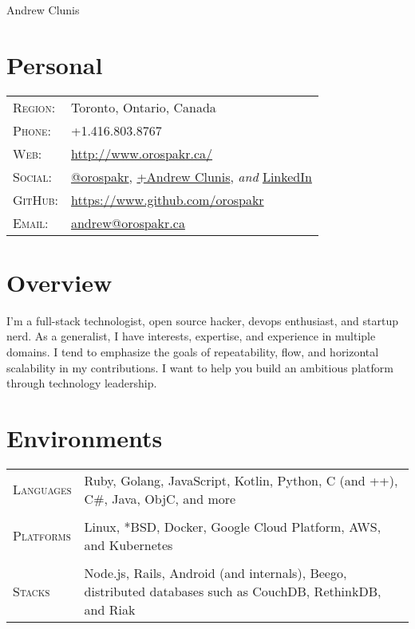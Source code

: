 \documentclass[letterpaper,10pt]{article}
\begin{document}
\pagestyle{empty} %

\par{\centering
{\Huge Andrew \textsc Clunis
}\bigskip\par}

\section{Personal}
\begin{longtable}{p{3cm}|p{12cm}}
  \textsc{Region:} & Toronto, Ontario, Canada \\
  \textsc{Phone:} & +1.416.803.8767 \\
  \textsc{Web:} &  \href{http://www.orospakr.ca/}{http://www.orospakr.ca/} \\
  \textsc{Social:} & \href{http://twitter.com/orospakr}{@orospakr}, \href{https://plus.google.com/101728978406554574081}{+Andrew Clunis}, \emph{and} \href{http://www.linkedin.com/profile/view?id=16226844}{LinkedIn}\\
  \textsc{GitHub:} & \href{https://github.com/orospakr}{https://www.github.com/orospakr} \\
  \textsc{Email:} & \href{mailto:Andrew Clunis <andrew@orospakr.ca>}{andrew@orospakr.ca} \\
\end{longtable}

\section{Overview}
I'm a full-stack technologist, open source hacker, devops enthusiast, and startup nerd.  As a generalist, I have interests, expertise, and experience in multiple domains.  I tend to emphasize the goals of repeatability, flow, and horizontal scalability in my contributions.  I want to help you build an ambitious platform through technology leadership.

\section{Environments}
\begin{longtable}{p{3cm}|p{12cm}}
  \textsc{Languages} & Ruby, Golang, JavaScript, Kotlin, Python, C (and ++), C\#, Java, ObjC, and more \\
  \multicolumn{2}{c}{} \\
  \textsc{Platforms} & Linux, *BSD, Docker, Google Cloud Platform, AWS, and Kubernetes \\
  \multicolumn{2}{c}{} \\
  \textsc{Stacks} & Node.js, Rails, Android (and internals), Beego, distributed databases such as CouchDB, RethinkDB, and Riak \\
\end{longtable}
\end{document}
